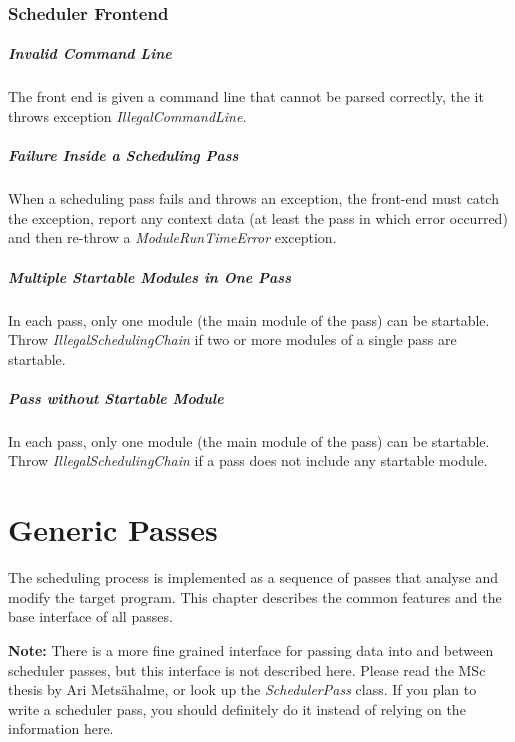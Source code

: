 \documentclass[a4paper,twoside]{tce}
\begin{document}
\subsection{Scheduler Frontend}
\label{ssec:SchedulerFrontend-err}

\paragraph{Invalid Command Line}

The front end is given a command line that cannot be parsed correctly, the
it throws exception \emph{IllegalCommandLine}.

\paragraph{Failure Inside a Scheduling Pass}

When a scheduling pass fails and throws an exception, the front-end must
catch the exception, report any context data (at least the pass in which
error occurred) and then re-throw a \emph{ModuleRunTimeError} exception.

\paragraph{Multiple Startable Modules in One Pass}

In each pass, only one module (the main module of the pass) can be
startable. Throw \emph{IllegalSchedulingChain} if two or more modules of a
single pass are startable.

\paragraph{Pass without Startable Module}

In each pass, only one module (the main module of the pass) can be
startable. Throw \emph{IllegalSchedulingChain} if a pass does not include
any startable module.


\chapter{Generic Passes}

The scheduling process is implemented as a sequence of passes that analyse
and modify the target program. This chapter describes the common features
and the base interface of all passes.

{\bf Note:} There is a more fine grained interface for passing data
into and between scheduler passes, but this interface is not described
here. Please read the MSc thesis by Ari Mets\"ahalme, or look up the
\emph{SchedulerPass} class. If you plan to write a scheduler pass, you
should definitely do it instead of relying on the information here.
\end{document}
